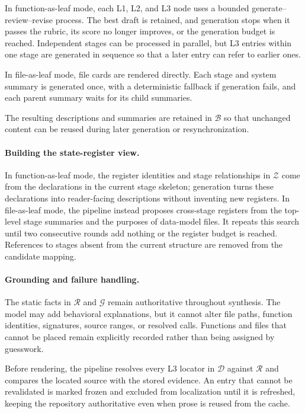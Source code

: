 \documentclass[]{ailab}
\newcommand{\hbsmall}{\textsf{function-as-leaf}}
\newcommand{\hblarge}{\textsf{file-as-leaf}}
\begin{document}
In \hbsmall{} mode, each L1, L2, and L3 node uses a bounded
generate--review--revise process. The best draft is retained, and generation
stops when it passes the rubric, its score no longer improves, or the generation
budget is reached. Independent stages can be processed in parallel, but L3
entries within one stage are generated in sequence so that a later entry can
refer to earlier ones.

In \hblarge{} mode, file cards are rendered directly. Each stage and system
summary is generated once, with a deterministic fallback if generation fails,
and each parent summary waits for its child summaries.

The resulting descriptions and summaries are retained in $\mathcal{B}$ so that
unchanged content can be reused during later generation or resynchronization.

\paragraph{Building the state-register view.}
In \hbsmall{} mode, the register identities and stage relationships in
$\mathcal{Z}$ come from the declarations in the current stage skeleton;
generation turns these declarations into reader-facing descriptions without
inventing new registers.
In \hblarge{} mode, the pipeline instead proposes cross-stage registers from the
top-level stage summaries and the purposes of data-model files. It repeats this
search until two consecutive rounds add nothing or the register budget is
reached. References to stages absent from the current structure are removed from
the candidate mapping.

\paragraph{Grounding and failure handling.}
The static facts in $\mathcal{R}$ and $\mathcal{G}$ remain authoritative
throughout synthesis. The model may add behavioral explanations, but it cannot
alter file paths, function identities, signatures, source ranges, or resolved
calls. Functions and files that cannot be placed remain explicitly recorded
rather than being assigned by guesswork.

Before rendering, the pipeline resolves every L3 locator in $\mathcal{D}$
against $\mathcal{R}$ and compares the located source with the stored evidence.
An entry that cannot be revalidated is marked frozen and excluded from
localization until it is refreshed, keeping the repository authoritative even
when prose is reused from the cache.
\end{document}
